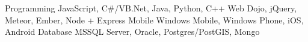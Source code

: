 \begin{cvskills}
  \cvskill
    {Programming}
    {JavaScript, C\#/VB.Net, Java, Python, C++}
  \cvskill
    {Web}
    {Dojo, jQuery, Meteor, Ember, Node + Express}
  \cvskill
    {Mobile}
    {Windows Mobile, Windows Phone, iOS, Android}
  \cvskill
    {Database}
    {MSSQL Server, Oracle, Postgres/PostGIS, Mongo}
\end{cvskills}
